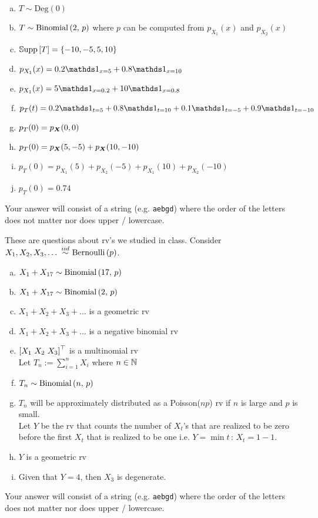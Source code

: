 \documentclass[12pt,landscape]{article}
\newcommand{\instr}{\small Your answer will consist of a string (e.g. \texttt{aebgd}) where the order of the letters does not matter nor does upper / lowercase. \normalsize}
\begin{document}
\begin{enumerate}[(a)]
\item $T \sim \text{Deg}(0)$
\item $T \sim \mathrm{Binomial}\left(2,\,p\right)$ where $p$ can be computed from $p_{X_1}(x)$ and $p_{X_2}(x)$
\item $\mathbb{S}\text{upp}\left[T\right] = \left\{-10, -5, 5, 10\right\}$
\item $p_{X_1}(x) = 0.2 \indic{x = 5} + 0.8 \indic{x = 10}$
\item $p_{X_1}(x) = 5 \indic{x = 0.2} + 10 \indic{x = 0.8}$
\item $p_{T}(t) = 0.2 \indic{t = 5} + 0.8 \indic{t = 10} + 0.1 \indic{t = -5} + 0.9 \indic{t = -10}$
\item $p_{T}(0) = p_{\boldsymbol{X}}(0, 0)$
\item $p_{T}(0) = p_{\boldsymbol{X}}(5, -5) + p_{\boldsymbol{X}}(10, -10)$
\item $p_{T}(0) = p_{X_1}(5) + p_{X_2}(-5) + p_{X_1}(10) + p_{X_2}(-10)$
\item $p_{T}(0) = 0.74$
\end{enumerate}
\eenum\instr\pagebreak




\problem{} These are questions about rv's we studied in class. Consider $X_1, X_2, X_3, \ldots \iid \bernoulli{p}$.
\vspace{-0.2cm}\benum{} 

\begin{enumerate}[(a)]
\item $X_1 + X_{17} \sim \mathrm{Binomial}\left(17,\,p\right)$
\item $X_1 + X_{17} \sim \mathrm{Binomial}\left(2,\,p\right)$
\item $X_1 + X_2 + X_3 + \ldots$ is a geometric rv
\item $X_1 + X_2 + X_3 + \ldots$ is a negative binomial rv
\item $\left[X_1~ X_2~ X_3\right]^\top$ is a multinomial rv\\

Let $T_n := \sum_{i=1}^n X_i$ where $n \in \mathbb{N}$

\item $T_n \sim \mathrm{Binomial}\left(n,\,p\right)$
\item $T_n$ will be approximately distributed as a Poisson($np$) rv if $n$ is large and $p$ is small.\\

Let $Y$ be the rv that counts the number of $X_t$'s that are realized to be zero before the first $X_t$ that is realized to be one i.e. $Y = \min{t\,:\, X_t = 1} - 1$. 
\item $Y$ is a geometric rv
\item Given that $Y = 4$, then $X_3$ is degenerate.
\end{enumerate}
\eenum\instr\pagebreak
\end{document}
